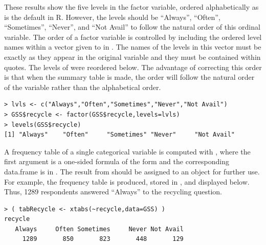 \documentclass[10pt,openany]{book}\usepackage[]{graphicx}\usepackage[]{color}
\makeatletter
\newenvironment{kframe}{%
 \def\at@end@of@kframe{}%
 \ifinner\ifhmode%
  \def\at@end@of@kframe{\end{minipage}}%
  \begin{minipage}{\columnwidth}%
 \fi\fi%
 \def\FrameCommand##1{\hskip\@totalleftmargin \hskip-\fboxsep
 \colorbox{shadecolor}{##1}\hskip-\fboxsep
     \hskip-\linewidth \hskip-\@totalleftmargin \hskip\columnwidth}%
 \MakeFramed {\advance\hsize-\width
   \@totalleftmargin\z@ \linewidth\hsize
   \@setminipage}}%
 {\par\unskip\endMakeFramed%
 \at@end@of@kframe}
\newenvironment{knitrout}{}{} %
\makeatother
\begin{document}
These results show the five levels in the  factor variable, ordered alphabetically as is the default in R.  However, the levels should be ``Always'', ``Often'', ``Sometimes'', ``Never'', and ``Not Avail'' to follow the natural order of this ordinal variable.  The order of a factor variable is controlled by including the ordered level names within a vector given to  in .  The names of the levels in this vector must be exactly as they appear in the original variable and they must be contained within quotes.  The levels of  were reordered below. The advantage of correcting this order is that when the summary table is made, the order will follow the natural order of the variable rather than the alphabetical order.
\begin{knitrout}
\color{fgcolor}\begin{kframe}
\begin{verbatim}
> lvls <- c("Always","Often","Sometimes","Never","Not Avail")
> GSS$recycle <- factor(GSS$recycle,levels=lvls)
> levels(GSS$recycle)
[1] "Always"    "Often"     "Sometimes" "Never"     "Not Avail"
\end{verbatim}
\end{kframe}
\end{knitrout}


\vspace{-12pt}

A frequency table of a single categorical variable is computed with , where the first argument is a one-sided formula of the form  and the corresponding data.frame is in .  The result from  should be assigned to an object for further use.  For example, the frequency table is produced, stored in , and displayed below. Thus, 1289 respondents answered ``Always'' to the recycling question.
\begin{knitrout}
\color{fgcolor}\begin{kframe}
\begin{verbatim}
> ( tabRecycle <- xtabs(~recycle,data=GSS) )
recycle
   Always     Often Sometimes     Never Not Avail 
     1289       850       823       448       129 
\end{verbatim}
\end{kframe}
\end{knitrout}
\end{document}
